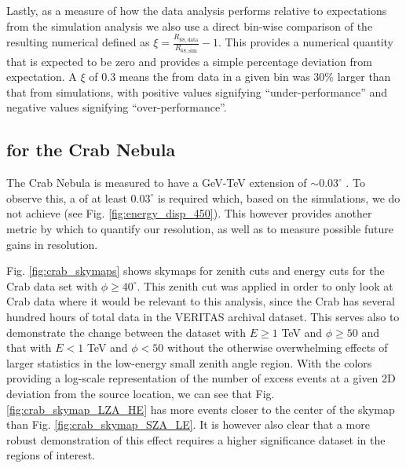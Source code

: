 \documentclass[main.tex]{subfiles}
\begin{document}
Lastly, as a measure of how the data analysis performs relative to expectations from the simulation analysis we also use a direct bin-wise comparison of the resulting numerical \rse defined as $\xi = \frac{R_{68, \text{data}}}{R_{68, \text{sim}}}-1$. This provides a numerical quantity that is expected to be zero and provides a simple percentage deviation from expectation. A $\xi$ of $0.3$ means the \rse from data in a given bin was 30\% larger than that from simulations, with positive values signifying ``under-performance'' and negative values signifying ``over-performance''.

\subsection{\rse for the Crab Nebula}

The Crab Nebula is measured to have a GeV-TeV extension of $\sim 0.03^\circ$ \cite{Fermi_LAT_Crab_extension}\cite{HESS_Crab_extension}. To observe this, a \rse of at least $0.03^\circ$ is required which, based on the simulations, we do not achieve (see Fig. \ref{fig:energy_disp_450}). This however provides another metric by which to quantify our resolution, as well as to measure possible future gains in resolution.

Fig. \ref{fig:crab_skymaps} shows skymaps for zenith cuts and energy cuts for the Crab data set with $\phi\geq40^\circ$. This zenith cut was applied in order to only look at Crab data where it would be relevant to this analysis, since the Crab has several hundred hours of total data in the VERITAS archival dataset. This serves also to demonstrate the change between the dataset with $E\geq1$ TeV and $\phi\geq 50$ and that with $E<1$ TeV and $\phi<50$ without the otherwise overwhelming effects of larger statistics in the low-energy small zenith angle region. With the colors providing a log-scale representation of the number of excess events at a given 2D deviation from the source location, we can see that Fig. \ref{fig:crab_skymap_LZA_HE} has more events closer to the center of the skymap than Fig. \ref{fig:crab_skymap_SZA_LE}. It is however also clear that a more robust demonstration of this effect requires a higher significance dataset in the regions of interest.
\end{document}
